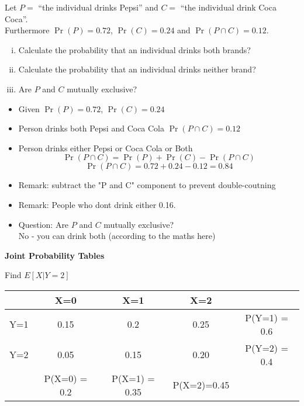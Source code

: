 \item Let $P = $ ``the individual drinks Pepsi'' and $C = $ ``the individual drink Coca Coca''.\\ Furthermore $\Pr(P) = 0.72$, $\Pr(C) = 0.24$ and $\Pr(P \cap C) = 0.12$.\\[-0.2cm]

\begin{enumerate}[(i)]
\item Calculate the probability that an individual drinks both brands? 
\item Calculate the probability that an individual drinks neither brand? 
\item Are $P$ and $C$ mutually exclusive? 
\end{enumerate}

\begin{framed}


\begin{itemize}
\item Given $\Pr(P) = 0.72$, $\Pr(C) = 0.24$
\item Person drinks both Pepsi and Coca Cola $\Pr(P \cap C) = 0.12$
\item Person drinks either Pepsi or Coca Cola  or Both
\[\Pr(P \cap C) = \Pr(P) +  \Pr(C)   - \Pr(P \cap C) \]
\[\Pr(P \cap C) = 0.72 +  0.24  - 0.12 = 0.84\]
\item Remark: subtract the "P and C" component to prevent double-coutning
\item Remark: People who dont drink either 0.16.
\item Question: Are $P$ and $C$ mutually exclusive?
\\ No - you can drink both (according to the maths here)
\end{itemize}
\end{framed}

\item \textbf{Joint Probability Tables}

Find $E[X|Y=2]$

\begin{tabular}{ccccc}
& X=0  & X=1  & X=2  &              \\ \hline
Y=1 & 0.15 & 0.2  & 0.25 & P(Y=1) = 0.6 \\ \hline
Y=2 & 0.05 & 0.15 & 0.20 & P(Y=2) = 0.4 \\ \hline
& P(X=0) = 0.2  & P(X=1) = 0.35  & P(X=2)=0.45  &              \\ \hline
\end{tabular}


